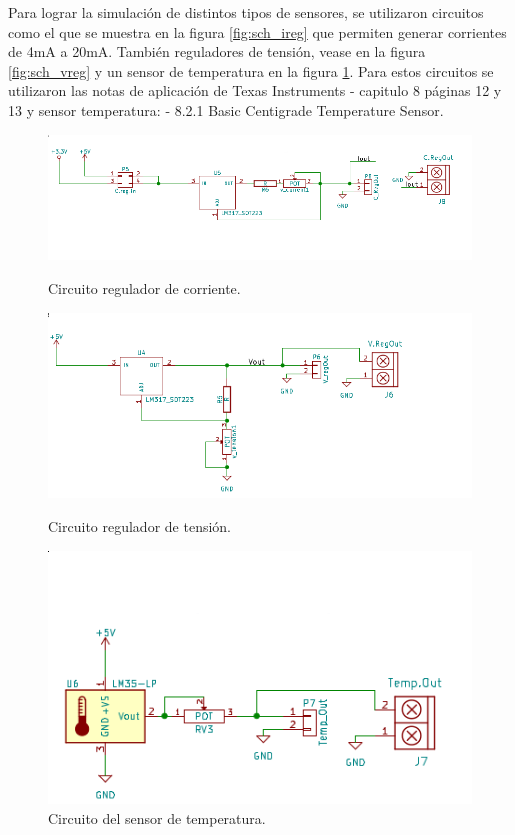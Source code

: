 Para lograr la simulación de distintos tipos de sensores, se utilizaron circuitos como el que se muestra en la figura \ref{fig:sch_ireg}  que permiten generar corrientes de 4mA a 20mA.
También reguladores de tensión, vease en la figura \ref{fig:sch_vreg} y un sensor de temperatura en la figura \ref{fig:sch_lm35}. Para estos circuitos se utilizaron las notas de aplicación de Texas Instruments\citep{Texas:LM317} - capitulo 8 páginas 12 y 13 y sensor temperatura: \citep{Texas:LM35} - 8.2.1 Basic Centigrade Temperature Sensor. 
\begin{figure}[!hp]
  \centering
  \includegraphics[scale=0.5]{./Figures/sch_ireg.png}
  \caption{Circuito regulador de corriente.}
  \label{fig:sch_ireg}
  \includegraphics[scale=0.5]{./Figures/sch_vreg.png}
  \caption{Circuito regulador de tensión.}
  \label{fig:sch_vreg}
  \includegraphics[scale=0.5]{./Figures/sch_lm35.png}
  \caption{Circuito del sensor de temperatura.}
  \label{fig:sch_lm35}
\end{figure}

